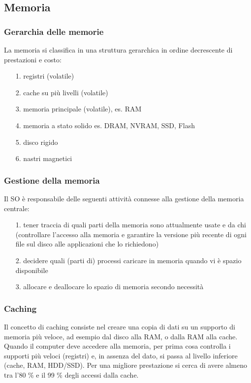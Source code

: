 \documentclass[a4paper]{article}
\begin{document}
\subsection{Memoria}
\subsubsection*{Gerarchia delle memorie}
La memoria si classifica in una struttura gerarchica in ordine decrescente di prestazioni e costo:
\begin{itemize}
	\item[1.] registri (volatile)
	\item[2.] cache su più livelli (volatile)
	\item[3.] memoria principale (volatile), es. RAM
	\item[4.] memoria a stato solido es. DRAM, NVRAM, SSD, Flash
	\item[5.] disco rigido
	\item[6.] nastri magnetici
\end{itemize}

\subsubsection*{Gestione della memoria}
Il SO è responsabile delle seguenti attività connesse alla gestione della memoria centrale:
\begin{itemize}
	\item[1.] tener traccia di quali parti della memoria sono attualmente usate e da chi (controllare l'accesso alla memoria e
	garantire la versione più recente di ogni file sul disco alle applicazioni che lo richiedono)
	\item[2.] decidere quali (parti di) processi caricare in memoria quando vi è spazio disponibile
	\item[3.] allocare e deallocare lo spazio di memoria secondo necessità
\end{itemize}

\subsubsection*{Caching}
Il concetto di caching consiste nel creare una copia di dati su un supporto di memoria più veloce, ad esempio dal disco alla RAM,
o dalla RAM alla cache. Quando il computer deve accedere alla memoria, per prima cosa controlla i supporti più veloci (registri) 
e, in assenza del dato, si passa al livello inferiore (cache, RAM, HDD/SSD). Per una migliore prestazione si cerca di avere almeno
tra l'80 \% e il 99 \% degli accessi dalla cache.
\end{document}

